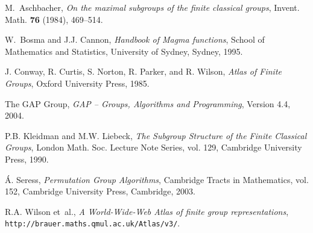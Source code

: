 \documentclass[a4paper,11pt]{article}
\begin{document}
\begin{thebibliography}{999}

M.~Aschbacher, \emph{On the maximal subgroups of the finite classical groups},
  Invent. Math. \textbf{76} (1984), 469--514.
  
W.~Bosma and J.J. Cannon, \emph{Handbook of {{\sc Magma}} functions}, School of
  Mathematics and Statistics, University of Sydney, Sydney, 1995.

J. Conway, R. Curtis, S. Norton, R. Parker, and R. Wilson, \emph{Atlas of
  {F}inite {G}roups}, Oxford University Press, 1985.
  
The {GAP} Group, \emph{{GAP} -- {G}roups, {A}lgorithms and {P}rogramming}, Version 4.4, 2004.

P.B. Kleidman and M.W. Liebeck, \emph{The {S}ubgroup {S}tructure of the
  {F}inite {C}lassical {G}roups}, London Math. Soc. Lecture Note Series, vol.
  129, Cambridge University Press, 1990.

{\'A}. Seress, \emph{Permutation {G}roup {A}lgorithms}, Cambridge
  Tracts in Mathematics, vol. 152, Cambridge University Press, Cambridge, 2003.
  
R.A. Wilson et~al., \emph{A {W}orld-{W}ide-{W}eb {A}tlas of finite group
  representations}, {\texttt{http://brauer.maths.qmul.ac.uk/Atlas/v3/}}.


\end{thebibliography}
\end{document}
